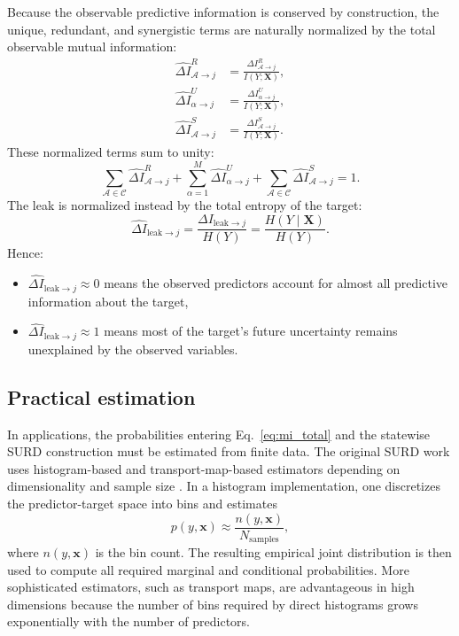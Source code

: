 \documentclass[fleqn,usenatbib]{mnras}
\begin{document}
Because the observable predictive information is conserved by construction, the unique, redundant, and synergistic terms are naturally normalized by the total observable mutual information:
\begin{equation}
\begin{aligned}
\widehat{\Delta I}_{\mathcal{A}\to j}^{R}
&=\frac{\Delta I_{\mathcal{A}\to j}^{R}}{I(Y;\mathbf{X})},\\
\widehat{\Delta I}_{\alpha\to j}^{U}
&=\frac{\Delta I_{\alpha\to j}^{U}}{I(Y;\mathbf{X})},\\
\widehat{\Delta I}_{\mathcal{A}\to j}^{S}
&=\frac{\Delta I_{\mathcal{A}\to j}^{S}}{I(Y;\mathbf{X})}.
\end{aligned}
\label{eq:normalized_atoms}
\end{equation}
These normalized terms sum to unity:
\begin{equation}
\sum_{\mathcal{A}\in\mathcal{C}}\widehat{\Delta I}_{\mathcal{A}\to j}^{R}
+
\sum_{\alpha=1}^{M}\widehat{\Delta I}_{\alpha\to j}^{U}
+
\sum_{\mathcal{A}\in\mathcal{C}}\widehat{\Delta I}_{\mathcal{A}\to j}^{S}
=1.
\end{equation}
The leak is normalized instead by the total entropy of the target:
\begin{equation}
\widehat{\Delta I}_{\mathrm{leak}\to j}
=
\frac{\Delta I_{\mathrm{leak}\to j}}{H(Y)}
=
\frac{H(Y\mid\mathbf{X})}{H(Y)}.
\label{eq:normalized_leak}
\end{equation}
Hence:
\begin{itemize}
    \item \(\widehat{\Delta I}_{\mathrm{leak}\to j}\approx 0\) means the observed predictors account for almost all predictive information about the target,
    \item \(\widehat{\Delta I}_{\mathrm{leak}\to j}\approx 1\) means most of the target's future uncertainty remains unexplained by the observed variables.
\end{itemize}

\subsection{Practical estimation}

In applications, the probabilities entering Eq.~\eqref{eq:mi_total} and the statewise SURD construction must be estimated from finite data. The original SURD work uses histogram-based and transport-map-based estimators depending on dimensionality and sample size \citep{MartinezSanchez2024SURD}. In a histogram implementation, one discretizes the predictor-target space into bins and estimates
\begin{equation}
p(y,\mathbf{x}) \approx \frac{n(y,\mathbf{x})}{N_{\mathrm{samples}}},
\end{equation}
where \(n(y,\mathbf{x})\) is the bin count. The resulting empirical joint distribution is then used to compute all required marginal and conditional probabilities. More sophisticated estimators, such as transport maps, are advantageous in high dimensions because the number of bins required by direct histograms grows exponentially with the number of predictors.
\end{document}
